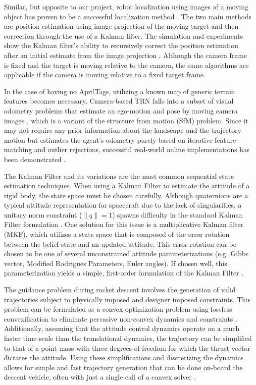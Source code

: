 \documentclass[conference]{IEEEtran}
\begin{document}
Similar, but opposite to our project, robot localization using images of a moving object has proven to be a successful localization method \cite{lee2003localization}. 
The two main methods are position estimation using image projection of the moving target and then correction through the use of a Kalman filter. 
The simulation and experiments show the Kalman filter's ability to recursively correct the position estimation after an initial estimate from the image projection \cite{lee2003localization}. 
Although the camera frame is fixed and the target is moving relative to the camera, the same algorithms are applicable if the camera is moving relative to a fixed target frame. 

In the case of having no AprilTags, utilizing a known map of generic terrain features becomes necessary. Camera-based TRN falls into a subset of visual odometry problems that estimate an ego-motion and pose by moving camera images \cite{nister2004visual, scaramuzza2011visual}, which is a variant of the structure from motion (SfM) problem.
Since it may not require any prior information about the landscape and the trajectory motion but estimates the agent's odometry purely based on iterative feature-matching and outlier rejections, successful real-world online implementations has been demonstrated \cite{christian2021image}.

The Kalman Filter and its variations are the most common sequential state estimation techniques. 
When using a Kalman Filter to estimate the attitude of a rigid body, the state space must be chosen carefully. 
Although quaternions are a typical attitude representation for spacecraft due to the lack of singularities, a unitary norm constraint ($\|q\|=1$) spawns difficulty in the standard Kalman Filter formulation \cite{markley2003mekf}. 
One solution for this issue is a multiplicative Kalman filter (MKF), which utilizes a state space that is composed of the error rotation between the belief state and an updated attitude. 
This error rotation can be chosen to be one of several unconstrained attitude parameterizations (e.g. Gibbs vector, Modified Rodrigues Parameters, Euler angles). If chosen well, this parameterization yields a simple, first-order formulation of the Kalman Filter \cite{markley2003mekf}.

The guidance problem during rocket descent involves the generation of valid trajectories subject to physically imposed and designer imposed constraints. This problem can be formulated as a convex optimization problem using lossless convexification to eliminate pervasive non-convex dynamics and constraints \cite{malyuta2021convex}. Additionally, assuming that the attitude control dynamics operate on a much faster time-scale than the translational dynamics, the trajectory can be simplified to that of a point mass with three degrees of freedom for which the thrust vector dictates the attitude. Using these simplifications and discretizing the dynamics allows for simple and fast trajectory generation that can be done on-board the descent vehicle, often with just a single call of a convex solver \cite{malyuta2021convex}. 
\end{document}
